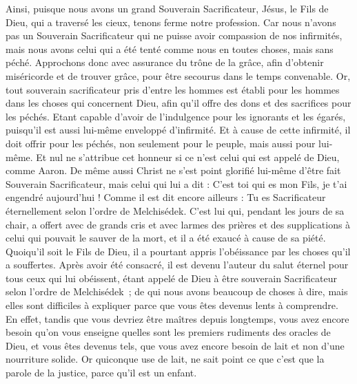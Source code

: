 \begin{multicols}{2}
Ainsi, puisque nous avons un grand Souverain Sacrificateur, Jésus, le Fils de Dieu, qui a traversé les cieux, tenons ferme notre profession.
Car nous n'avons pas un Souverain Sacrificateur qui ne puisse avoir compassion de nos infirmités, mais nous avons celui qui a été tenté comme nous en toutes choses, mais sans péché.
Approchons donc avec assurance du trône de la grâce, afin d’obtenir miséricorde et de trouver grâce, pour être secourus dans le temps convenable.
\VerseOne{}Or, tout souverain sacrificateur pris d'entre les hommes  est établi pour les hommes dans les choses qui concernent Dieu, afin qu'il offre des dons et des sacrifices pour les péchés.
Etant capable d'avoir de l'indulgence pour les ignorants et les égarés, puisqu'il est aussi lui-même enveloppé d'infirmité.
Et à cause de cette infirmité, il doit offrir pour les péchés, non seulement pour le peuple, mais aussi pour lui-même.
Et nul ne s'attribue cet honneur si ce n’est celui qui est appelé de Dieu, comme Aaron.
De même aussi Christ ne s'est point glorifié lui-même d'être fait Souverain Sacrificateur, mais celui qui lui a dit : C’est toi qui es mon Fils, je t'ai engendré aujourd'hui !
Comme il est dit encore ailleurs : Tu es Sacrificateur éternellement selon l'ordre de Melchisédek.
C’est lui qui, pendant les jours de sa chair, a offert avec de grands cris et avec larmes des prières et des supplications à celui qui pouvait le sauver de la mort, et il a été exaucé à cause de sa piété.
Quoiqu'il soit le Fils de Dieu, il a pourtant appris l'obéissance par les choses qu'il a souffertes.
Après avoir été consacré, il est devenu l'auteur du salut éternel pour tous ceux qui lui obéissent,
étant appelé de Dieu à être souverain Sacrificateur selon l’ordre de Melchisédek ;
de qui nous avons beaucoup de choses à dire, mais elles sont difficiles à expliquer parce que vous êtes devenus lents à comprendre.
En effet, tandis que vous devriez être maîtres depuis longtemps, vous avez encore besoin qu'on vous enseigne quelles sont les premiers rudiments des oracles de Dieu, et vous êtes devenus tels, que vous avez encore besoin de lait et non d’une nourriture solide.
Or quiconque use de lait, ne sait point ce que c’est que la parole de la justice, parce qu’il est un enfant.

\end{multicols}
